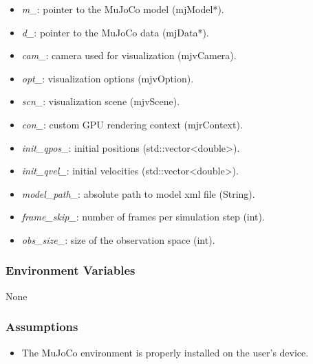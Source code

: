 \documentclass[12pt, titlepage]{article}
\begin{document}
\begin{itemize}
  \item \textit{m\_}: pointer to the MuJoCo model (mjModel*).
  \item \textit{d\_}: pointer to the MuJoCo data (mjData*).
  \item \textit{cam\_}: camera used for visualization (mjvCamera).
  \item \textit{opt\_}: visualization options (mjvOption).
  \item \textit{scn\_}: visualization scene (mjvScene).
  \item \textit{con\_}: custom GPU rendering context (mjrContext).  
  \item \textit{init\_qpos\_}: initial positions (std::vector\textless double\textgreater). 
  \item \textit{init\_qvel\_}: initial velocities (std::vector\textless double\textgreater).
  \item \textit{model\_path\_}: absolute path to model xml file (String).
  \item \textit{frame\_skip\_}: number of frames per simulation step (int).  
  \item \textit{obs\_size\_}: size of the observation space (int).  
\end{itemize}

\subsubsection{Environment Variables}

None

\subsubsection{Assumptions}

\begin{itemize}
  \item The MuJoCo environment is properly installed on the user's device.
\end{itemize}
\end{document}
